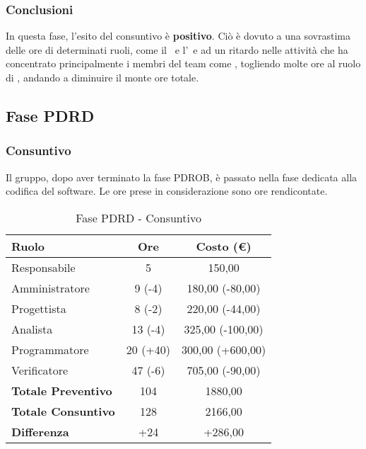 \documentclass[../PianoProgetto.tex]{subfiles}
\begin{document}
	\subsubsection{Conclusioni}	
     In questa fase, l'esito del consuntivo è \textbf{positivo}. 
     Ciò è dovuto a una sovrastima delle ore di determinati ruoli, come il \responsabilediprogetto\ e l'\analista\, e ad un ritardo nelle attività che ha concentrato principalmente i membri del team come \progettisti, togliendo molte ore al ruolo di \programmatore, andando a diminuire il monte ore totale.
	
	\subsection{Fase PDRD}
	\subsubsection{Consuntivo}
	Il gruppo, dopo aver terminato la fase PDROB, è passato nella fase dedicata alla codifica del software\g. Le ore prese in considerazione sono ore rendicontate. 
	
	\begin{table}[h]
		\centering
		\begin{tabular}{l * {2}{c}}
			\toprule
			\textbf{Ruolo} & \textbf{Ore} & \textbf{Costo (\euro{})} \\
			\midrule
			Responsabile &		5 & 150,00  \\
			Amministratore &	9 (-4) & 180,00  (-80,00) \\
			Progettista & 		8 (-2) & 220,00  (-44,00)\\
			Analista & 			13	(-4)	& 325,00   (-100,00)       \\
			Programmatore & 	20	(+40)	& 300,00 	(+600,00)			\\
			Verificatore & 		47 (-6) & 705,00 (-90,00)	\\
			\midrule
			\textbf{Totale Preventivo} & 104
			& 1880,00
			\\		
			\textbf{Totale Consuntivo} & 128 & 2166,00
			\\
			\midrule
			\textbf{Differenza} & +24 & +286,00 \\
			\bottomrule
		\end{tabular}
		
		\caption{Fase PDRD - Consuntivo}
		\label{tab:consuntivoPDRD}
		
	\end{table}			
	
\end{document}
